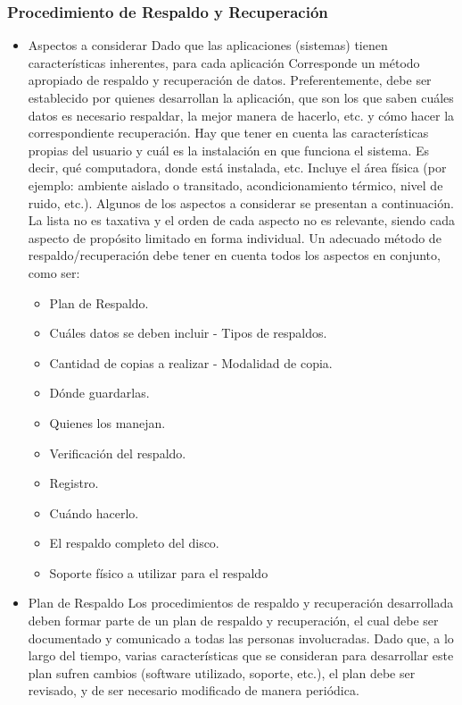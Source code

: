 \documentclass[a4paper,openright,12pt]{book}
\begin{document}
\subsubsection*{Procedimiento de Respaldo y Recuperación}
\begin{itemize}


\item 	Aspectos a considerar
Dado que las aplicaciones (sistemas) tienen características inherentes, para cada aplicación
Corresponde un método apropiado de respaldo y recuperación de datos. Preferentemente, debe ser establecido por quienes desarrollan la aplicación, que son los que saben cuáles datos es necesario respaldar, la mejor manera de hacerlo, etc. y cómo hacer la correspondiente recuperación. Hay que tener en cuenta las características propias del usuario y cuál es la instalación en que funciona el sistema. Es decir, qué computadora, donde está instalada, etc. Incluye el área física (por ejemplo: ambiente aislado o transitado, acondicionamiento térmico, nivel de ruido, etc.).  
Algunos de los aspectos a considerar se presentan a continuación. La lista no es taxativa y el orden de cada aspecto no es relevante, siendo cada aspecto de propósito limitado en forma individual. Un adecuado método de respaldo/recuperación debe tener en cuenta todos los aspectos en conjunto, como ser:  
\begin{itemize}


\item Plan de Respaldo.
\item Cuáles datos se deben incluir - Tipos de  respaldos.
\item Cantidad de copias a realizar - Modalidad de copia.
\item Dónde guardarlas.
\item Quienes los manejan.
\item Verificación del respaldo.
\item Registro.
\item Cuándo hacerlo.
\item El respaldo completo del disco.
\item Soporte físico a utilizar para el respaldo 
\end{itemize}
\item  Plan de Respaldo  
Los procedimientos de respaldo y recuperación desarrollada deben formar parte de un plan de respaldo y recuperación, el cual debe ser documentado y comunicado a todas las personas involucradas. Dado que, a lo largo del tiempo, varias características que se consideran para desarrollar este plan sufren cambios (software utilizado, soporte,
etc.), el plan debe ser revisado, y de ser necesario modificado de manera periódica. 
 

\end{itemize}
\end{document}
